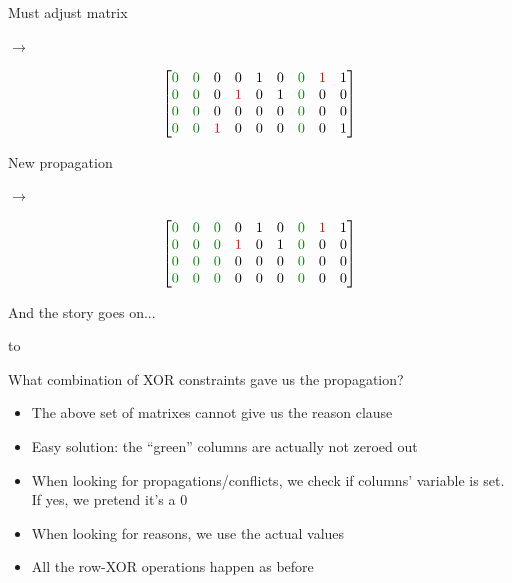 \documentclass[aspectratio=196]{slides}
\def\TITLE#1{\hbox to \linewidth{\large #1\hfill}}
\def\BOTTOM{\vfill\newpage}
\def\SLIDE#1{\BOTTOM\TITLE{#1}}
\begin{document}
\begin{minipage}{0.2\linewidth}
\centering
Must adjust matrix

$\rightarrow$
\end{minipage}
\begin{minipage}{0.3\linewidth}
\[
\begin{bmatrix}
\color{darkgreen}0 & \color{darkgreen}0 &           0 &            0 & 1 & 0 & \color{darkgreen}0 & \color{red}1 & 1\\
\color{darkgreen}0 & \color{darkgreen}0 &           0 & \color{red}1 & 0 & 1 & \color{darkgreen}0 &            0 & 0\\
\color{darkgreen}0 & \color{darkgreen}0 &           0 &            0 & 0 & 0 & \color{darkgreen}0 &            0 & 0\\
\color{darkgreen}0 & \color{darkgreen}0 &\color{red}1 &            0 & 0 & 0 & \color{darkgreen}0 &            0 & 1\\
\end{bmatrix}
\]
\end{minipage}
\begin{minipage}{0.2\linewidth}
\centering
New propagation

$\rightarrow$
\end{minipage}
\begin{minipage}{0.3\linewidth}
\[
\begin{bmatrix}
\color{darkgreen}0 & \color{darkgreen}0 &\color{darkgreen}0 &            0 & 1 & 0 & \color{darkgreen}0 & \color{red}1 & 1\\
\color{darkgreen}0 & \color{darkgreen}0 &\color{darkgreen}0 & \color{red}1 & 0 & 1 & \color{darkgreen}0 &            0 & 0\\
\color{darkgreen}0 & \color{darkgreen}0 &\color{darkgreen}0 &            0 & 0 & 0 & \color{darkgreen}0 &            0 & 0\\
\color{darkgreen}0 & \color{darkgreen}0 &\color{darkgreen}0 &            0 & 0 & 0 & \color{darkgreen}0 &            0 & 0\\
\end{bmatrix}
\]
\end{minipage}

And the story goes on...

\vfill
\newpage
\SLIDE{CDCL(T) Gauss-Jordan Elimination: Reason Clauses}
\vspace{2ex}

What combination of XOR constraints gave us the propagation?
\begin{itemize}
\item The above set of matrixes cannot give us the reason clause
\item Easy solution: the ``green'' columns are actually not zeroed out
\item When looking for propagations/conflicts, we check if columns' variable is set. If yes, we pretend it's a 0
\item When looking for reasons, we use the actual values
\item All the row-XOR operations happen as before
\end{itemize}
\end{document}
